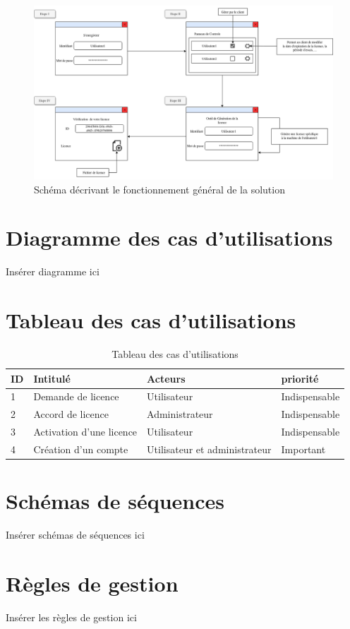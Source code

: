 \begin{figure}[hp]
	\centering
	\includegraphics[width=18cm]{main/STB.png}
	\caption{Schéma décrivant le fonctionnement général de la solution}
	\label{fig:fig1}
\end{figure}

\newpage

\section{Diagramme des cas d'utilisations}

Insérer diagramme ici

\section{Tableau des cas d'utilisations}

\begin{table}[h]
	\centering
	\begin{tabular}{ | m{0.6cm} | m{6cm} | m{6cm}| m{3cm} | } 
                \hline
		\textbf{ID} & \textbf{Intitulé} & \textbf{Acteurs} & \textbf{priorité} \\
                \hline
			1 & Demande de licence & Utilisateur & Indispensable \\
                \hline
			2 & Accord de licence & Administrateur & Indispensable \\
                \hline
			3 & Activation d'une licence & Utilisateur & Indispensable \\
		\hline
			4 & Création d'un compte & Utilisateur et administrateur & Important \\
		\hline
        \end{tabular}
	\caption{Tableau des cas d'utilisations}
	\label{tab:tab1}
\end{table}

\section{Schémas de séquences}

Insérer schémas de séquences ici

\section{Règles de gestion}

Insérer les règles de gestion ici
